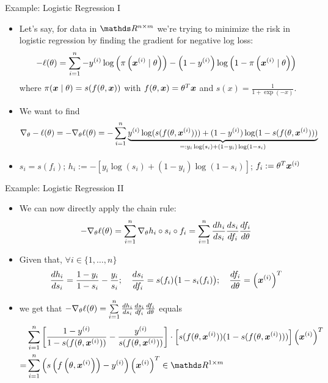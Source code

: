 \documentclass[11pt,compress,t,notes=noshow, xcolor=table]{beamer}
\begin{document}
\begin{framev}{Example: Logistic Regression I}
\begin{itemize}    \setlength{\itemsep}{0.5\baselineskip}
\item Let's say, for data in $\R^{n\times m}$ we're trying to minimize the risk in logistic regression by finding the gradient for negative log loss:
$$
-\ell({\theta})=\sum_{i=1}^n-y^{(i)} \log \left(\pi\left(\bm{x}^{(i)} \mid \theta\right)\right)-\left(1-y^{(i)}\right) \log \left(1-\pi\left(\bm{x}^{(i)} \mid \theta\right)\right)
$$
where $
\pi(\bm{x} \mid {\theta})=s(f(\theta,\bm{x}))
$ with
$f(\theta,\bm{x})=\theta^{T} \bm{x}$ and $s(x)=\frac{1}{1+\exp (-x)}$.
\item[$\Rightarrow$] We want to find \begin{align*}
\nabla_\theta -\ell (\theta)=-\nabla_\theta \ell (\theta)&=-\sum\limits_{i=1}^n\underbrace{ y^{(i)} \log (s(f(\theta,\bm{x}^{(i)})))+(1-y^{(i)}) \log (1-s(f(\theta,\bm{x}^{(i)})))}_{=:y_i \log (s_i)+(1-y_i) \log (1-s_i)}
\end{align*}
\item $s_i = s(f_i)$; $h_i:=-[y_i \log (s_i)+(1-y_i) \log (1-s_i)]$; $f_i:=\theta^{T} \bm{x}^{(i)}$
\end{itemize}
\end{framev}


\begin{framev}[fs=small]{Example: Logistic Regression II}
\begin{itemize}    \setlength{\itemsep}{0.5\baselineskip}
\item We can now directly apply the chain rule:
$$
-\nabla_\theta \ell (\theta)=\sum\limits_{i=1}^n\nabla_\theta h_i\circ s_i \circ f_i=\sum\limits_{i=1}^n\frac{d h_i}{d s_i} \frac{d s_i}{d f_i} \frac{d f_i}{d \theta}
$$
\item Given that, $\forall i\in\{1,\dots,n\}$ $$\frac{d h_i}{d s_i}=\frac{1-y_i}{1-s_i}-\frac{y_i}{s_i};\quad\frac{d s_i}{d f_i}=s(f_i)\big(1-s_i(f_i)\big);\quad\frac{d f_i}{d \theta}=\left(\bm{x}^{(i)}\right)^T$$
\item we get that $-\nabla_\theta \ell (\theta)=\sum\limits_{i=1}^n\frac{d h_i}{d s_i} \frac{d s_i}{d f_i} \frac{d f_i}{d \theta}$ equals\begin{align*}
&\sumin \left[\frac{1-y^{(i)}}{1-s(f(\theta, \xv^{(i)}))}-\frac{y^{(i)}}{s(f(\theta, \xv^{(i)}))}\right] \cdot \left[s(f(\theta, \xv^{(i)}))(1-s(f(\theta, \xv^{(i)})))\right] \left(\xv^{(i)}\right)^T\\
=&\sumin\left(s\left(f\left(\theta,\xv^{(i)}\right)\right)-y^{(i)}\right)\left(\xv^{(i)}\right)^T\in\R^{1\times m}
\end{align*}
\end{itemize}
\end{framev}
\end{document}
